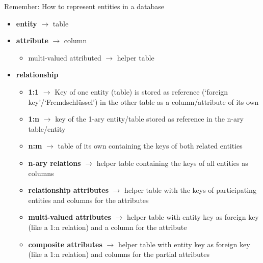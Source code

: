 \begin{frame}{Remember: How to represent entities in a database}
    \begin{itemize}
        \item \textbf{entity} $\to$ table
        \item \textbf{attribute} $\to$ column
        \begin{itemize}
            \item multi-valued attributed $\to$ helper table
        \end{itemize}
        \item \textbf{relationship}
            \begin{itemize}\footnotesize
                \item \textbf{1:1} $\to$ Key of one entity (table) is stored as reference (`foreign key'/`Fremdschlüssel') in the other table as a column/attribute of its own 
                \item \textbf{1:n} $\to$ key of the 1-ary entity/table stored as reference in the n-ary table/entity 
                \item \textbf{n:m} $\to$ table of its own containing the keys of both related entities
                \item \textbf{n-ary relations} $\to$ helper table containing the keys of all entities as columns 
                \item \textbf{relationship attributes} $\to$ helper table with the keys of participating entities and columns for the attributes 
                \item \textbf{multi-valued attributes} $\to$ helper table with entity key as foreign key (like a 1:n relation) and a column for the attribute 
                \item \textbf{composite attributes} $\to$ helper table with entity key as foreign key (like a 1:n relation) and columns for the partial attributes 
            \end{itemize}
    \end{itemize}
\end{frame}
  
